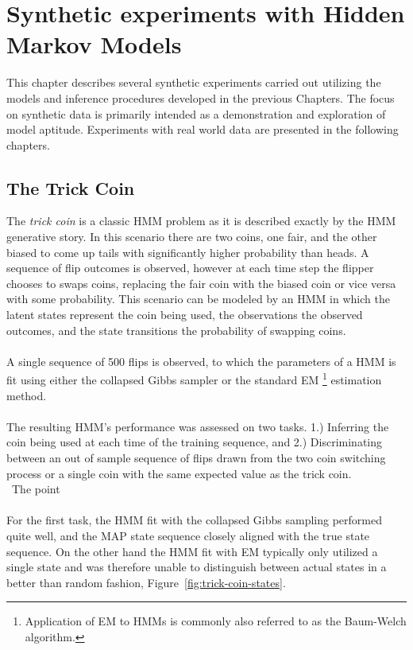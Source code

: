 \documentclass[12pt]{report}
\newcommand{\1}[0]{\mathbbm{1}}
\begin{document}
\chapter{Synthetic experiments with Hidden Markov Models}
\label{chap:Synthetic experiments with Hidden Markov Model}
This chapter describes several synthetic experiments carried out utilizing the models and
inference procedures developed in the previous Chapters. The focus on synthetic data
is primarily intended as a demonstration and exploration of model aptitude. Experiments
with real world data are presented in the following chapters.

\section{The Trick Coin}
The \emph{trick coin} is a classic \ac{HMM} problem as it is described exactly
by the \ac{HMM} generative story. In this scenario there are two coins, one fair,
and the other biased to come up tails with significantly higher probability than heads.
A sequence of flip outcomes is observed, however at each time step the flipper chooses
to swaps coins, replacing the fair coin with the biased coin or vice versa with some probability.
This scenario can be modeled by an \ac{HMM} in which the latent
states represent the coin being used, the observations the observed outcomes, and
the state transitions the probability of swapping coins.
\\\\
A single sequence of 500 flips is observed, to which the parameters of a \ac{HMM} is fit using
either the collapsed Gibbs sampler or the standard \ac{EM}
\footnote{Application of \ac{EM} to \acp{HMM} is commonly also referred to as
the Baum-Welch algorithm.}
estimation method.
\\\\
The resulting \ac{HMM}'s performance was assessed on two tasks. 1.) Inferring
the coin being used at each time of the training sequence, and 2.) Discriminating between an
out of sample sequence of flips drawn from the two coin switching process or a single coin with the
same expected value as the trick coin.
\\\
The point
\\\\
For the first task, the \ac{HMM} fit with the collapsed Gibbs sampling performed quite well,
and the \ac{MAP} state sequence closely aligned with the true state sequence.
On the other hand the \ac{HMM} fit with \ac{EM} typically only utilized a single state
and was therefore unable to distinguish between actual states in a better than random fashion,
Figure~\ref{fig:trick-coin-states}.
\end{document}
